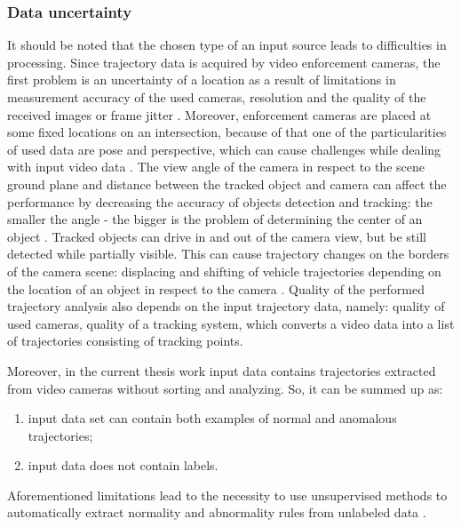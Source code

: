 \subsubsection{Data uncertainty}

It should be noted that the chosen type of an input source leads to difficulties in processing. Since trajectory data is acquired by video enforcement cameras, the first problem is an uncertainty of a location as a result of limitations in measurement accuracy of the used cameras, resolution and the quality of the received images or frame jitter \cite{article:4_detect_eatp}. Moreover, enforcement cameras are placed at some fixed locations on an intersection, because of that one of the particularities of used data are pose and perspective, which can cause challenges while dealing with input video data \cite{article:6_survey_anom_det_rtuvs}. The view angle of the camera in respect to the scene ground plane and distance between the tracked object and camera can affect the performance by decreasing the accuracy of objects detection and tracking: the smaller the angle - the bigger is the problem of determining the center of an object \cite{article:9_trb_vc_aev_sc}\cite{article:4_detect_eatp}. Tracked objects can drive in and out of the camera view, but be still detected while partially visible. This can cause trajectory changes on the borders of the camera scene: displacing and shifting of vehicle trajectories depending on the location of an object in respect to the camera \cite{article:4_detect_eatp}. Quality of the performed trajectory analysis also depends on the input trajectory data, namely: quality of used cameras, quality of a tracking system, which converts a video data into a list of trajectories consisting of tracking points.

Moreover, in the current thesis work input data contains trajectories extracted from video cameras without sorting and analyzing. So, it can be summed up as:

\begin{enumerate}
	\setlength\itemsep{0em}
	\item input data set can contain both examples of normal and anomalous trajectories;
	\item input data does not contain labels.
\end{enumerate}

Aforementioned limitations lead to the necessity to use unsupervised methods to automatically extract normality and abnormality rules from unlabeled data \cite{article:27_vna_cad_td}.
